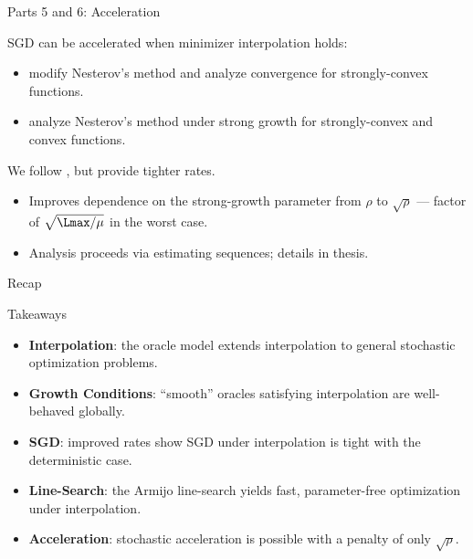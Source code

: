 \documentclass[mathserif,notheorems, hyperref={colorlinks, citecolor=blue, urlcolor=blue, linkcolor=blue}]{beamer}
\begin{document}
    \begin{frame}{Parts 5 and 6: Acceleration}

       SGD can be accelerated when minimizer interpolation holds:
       \begin{itemize}
           \item \citet{liu2020accelerating} modify Nesterov's method and analyze convergence for strongly-convex functions. 
      \vspace{1ex}
           \item \citet{vaswani2019fast} analyze Nesterov's method under strong growth for strongly-convex and convex functions. 
       \end{itemize}

      \vspace{2ex}
      We follow \citet{vaswani2019fast}, but provide tighter rates. 
      \begin{itemize}
          \item Improves dependence on the strong-growth parameter from \( \rho \) to \( \sqrt{\rho} \) --- factor of \( \sqrt{\Lmax / \mu} \) in the worst case. 
        \vspace{1ex}
          \item Analysis proceeds via estimating sequences; details in thesis.  
      \end{itemize}
        
    \end{frame}

    \begin{frame}{Recap}
       \begin{center}
         \vspace{-2ex}
         \Large Takeaways
         \vspace{1ex}
       \end{center}

        \begin{itemize}
            \item \textbf{Interpolation}: the oracle model extends interpolation to general stochastic optimization problems. 
                \vspace{1ex}
            \item \textbf{Growth Conditions}: ``smooth'' oracles satisfying interpolation are well-behaved globally. 
                \vspace{1ex}
            \item \textbf{SGD}: improved rates show SGD under interpolation is tight with the deterministic case. 
                \vspace{1ex}
            \item \textbf{Line-Search}: the Armijo line-search yields fast, parameter-free optimization under interpolation.  
                \vspace{1ex}
            \item \textbf{Acceleration}: stochastic acceleration is possible with a penalty of only \( \sqrt{\rho} \). 
        \end{itemize}
    \end{frame}
    
\end{document}
